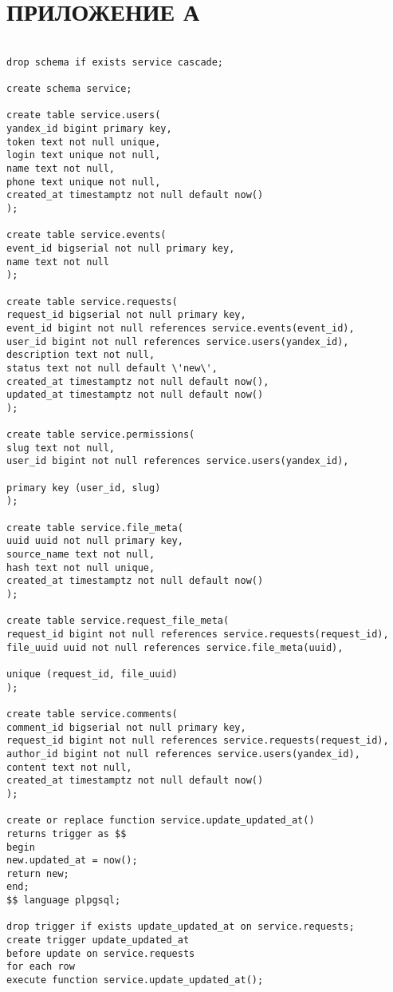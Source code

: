 \section*{ПРИЛОЖЕНИЕ А} \label{ПРИЛОЖЕНИЕ А}

\begin{lstlisting}[label=lst1:schema, caption=Схема базы данных]

drop schema if exists service cascade;

create schema service;

create table service.users(
yandex_id bigint primary key,
token text not null unique,
login text unique not null,
name text not null,
phone text unique not null,
created_at timestamptz not null default now()
);

create table service.events(
event_id bigserial not null primary key,
name text not null
);

create table service.requests(
request_id bigserial not null primary key,
event_id bigint not null references service.events(event_id),
user_id bigint not null references service.users(yandex_id),
description text not null,
status text not null default \'new\',
created_at timestamptz not null default now(),
updated_at timestamptz not null default now()
);

create table service.permissions(
slug text not null,
user_id bigint not null references service.users(yandex_id),

primary key (user_id, slug)
);

create table service.file_meta(
uuid uuid not null primary key,
source_name text not null,
hash text not null unique,
created_at timestamptz not null default now()
);

create table service.request_file_meta(
request_id bigint not null references service.requests(request_id),
file_uuid uuid not null references service.file_meta(uuid),

unique (request_id, file_uuid)
);

create table service.comments(
comment_id bigserial not null primary key,
request_id bigint not null references service.requests(request_id),
author_id bigint not null references service.users(yandex_id),
content text not null,
created_at timestamptz not null default now()
);

create or replace function service.update_updated_at()
returns trigger as $$
begin
new.updated_at = now();
return new;
end;
$$ language plpgsql;

drop trigger if exists update_updated_at on service.requests;
create trigger update_updated_at
before update on service.requests
for each row
execute function service.update_updated_at();

\end{lstlisting}
